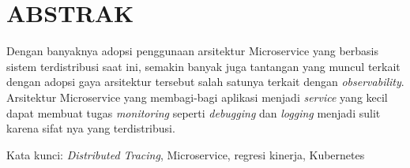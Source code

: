 \clearpage
\chapter*{ABSTRAK}

Dengan banyaknya adopsi penggunaan arsitektur Microservice yang berbasis sistem terdistribusi saat ini, semakin banyak juga tantangan yang muncul terkait dengan adopsi gaya arsitektur tersebut salah satunya terkait dengan \textit{observability}. Arsitektur Microservice yang membagi-bagi aplikasi menjadi \textit{service} yang kecil dapat membuat tugas \textit{monitoring} seperti \textit{debugging} dan \textit{logging} menjadi sulit karena sifat nya yang terdistribusi. 


\vspace{15mm}
Kata kunci: \textit{Distributed Tracing}, Microservice, regresi kinerja, Kubernetes
\clearpage